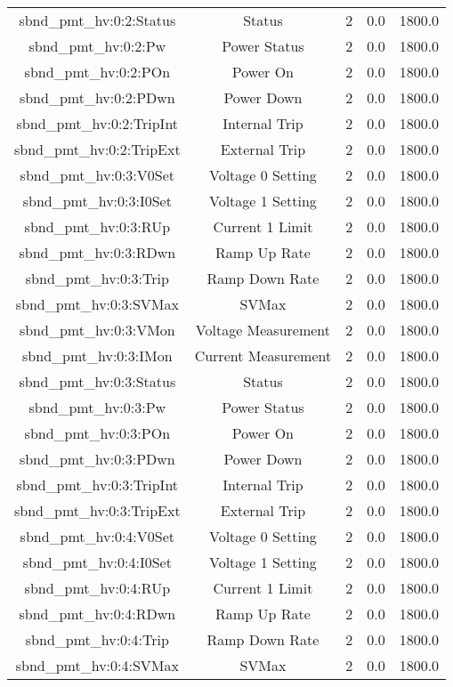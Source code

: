 \begin{center}
\begin{longtable}{c | c c c c }
sbnd\_pmt\_hv:0:2:Status & Status & 2 & 0.0 & 1800.0\\ 
sbnd\_pmt\_hv:0:2:Pw & Power Status & 2 & 0.0 & 1800.0\\ 
sbnd\_pmt\_hv:0:2:POn & Power On & 2 & 0.0 & 1800.0\\ 
sbnd\_pmt\_hv:0:2:PDwn & Power Down & 2 & 0.0 & 1800.0\\ 
sbnd\_pmt\_hv:0:2:TripInt & Internal Trip & 2 & 0.0 & 1800.0\\ 
sbnd\_pmt\_hv:0:2:TripExt & External Trip & 2 & 0.0 & 1800.0\\ 
sbnd\_pmt\_hv:0:3:V0Set & Voltage 0 Setting & 2 & 0.0 & 1800.0\\ 
sbnd\_pmt\_hv:0:3:I0Set & Voltage 1 Setting & 2 & 0.0 & 1800.0\\ 
sbnd\_pmt\_hv:0:3:RUp & Current 1 Limit & 2 & 0.0 & 1800.0\\ 
sbnd\_pmt\_hv:0:3:RDwn & Ramp Up Rate & 2 & 0.0 & 1800.0\\ 
sbnd\_pmt\_hv:0:3:Trip & Ramp Down Rate & 2 & 0.0 & 1800.0\\ 
sbnd\_pmt\_hv:0:3:SVMax & SVMax & 2 & 0.0 & 1800.0\\ 
sbnd\_pmt\_hv:0:3:VMon & Voltage Measurement & 2 & 0.0 & 1800.0\\ 
sbnd\_pmt\_hv:0:3:IMon & Current Measurement & 2 & 0.0 & 1800.0\\ 
sbnd\_pmt\_hv:0:3:Status & Status & 2 & 0.0 & 1800.0\\ 
sbnd\_pmt\_hv:0:3:Pw & Power Status & 2 & 0.0 & 1800.0\\ 
sbnd\_pmt\_hv:0:3:POn & Power On & 2 & 0.0 & 1800.0\\ 
sbnd\_pmt\_hv:0:3:PDwn & Power Down & 2 & 0.0 & 1800.0\\ 
sbnd\_pmt\_hv:0:3:TripInt & Internal Trip & 2 & 0.0 & 1800.0\\ 
sbnd\_pmt\_hv:0:3:TripExt & External Trip & 2 & 0.0 & 1800.0\\ 
sbnd\_pmt\_hv:0:4:V0Set & Voltage 0 Setting & 2 & 0.0 & 1800.0\\ 
sbnd\_pmt\_hv:0:4:I0Set & Voltage 1 Setting & 2 & 0.0 & 1800.0\\ 
sbnd\_pmt\_hv:0:4:RUp & Current 1 Limit & 2 & 0.0 & 1800.0\\ 
sbnd\_pmt\_hv:0:4:RDwn & Ramp Up Rate & 2 & 0.0 & 1800.0\\ 
sbnd\_pmt\_hv:0:4:Trip & Ramp Down Rate & 2 & 0.0 & 1800.0\\ 
sbnd\_pmt\_hv:0:4:SVMax & SVMax & 2 & 0.0 & 1800.0\\ 

\end{longtable}
\end{center}
